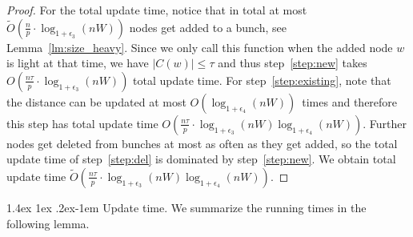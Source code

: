 \documentclass[11pt]{article}
\makeatletter
\theoremstyle{definition}
\theoremstyle{remark}
\renewcommand{\paragraph}{%
  \@startsection{paragraph}{4}%
  {\z@}{1.4ex \@plus 1ex \@minus .2ex}{-1em}%
  {\normalfont\normalsize\bfseries}%
}
\makeatother
\begin{document}
\begin{titlepage}
\begin{proof}
    For the total update time, notice that in total at most $\tilde O(\tfrac{n}{p}\cdot \log_{1+\epsilon_3}(nW))$ nodes get added to a bunch, see Lemma~\ref{lm:size_heavy}. Since we only call this function when the added node $w$ is light at that time, we have $|C(w)|\leq \tau$ and thus step~\ref{step:new} takes $O(\tfrac{n\tau}{p}\cdot \log_{1+\epsilon_3}(nW))$ total update time. For step~\ref{step:existing}, note that the distance can be updated at most $O(\log_{1+\epsilon_4}(nW))$~times and therefore this step has total update time $O(\tfrac{n\tau}{p}\cdot \log_{1+\epsilon_3}(nW)\log_{1+\epsilon_4}(nW))$. Further nodes get deleted from bunches at most as often as they get added, so the total update time of step~\ref{step:del} is dominated by step~\ref{step:new}. We obtain total update time $\tilde O ( \tfrac{n\tau }{p} \cdot \log_{1+\epsilon_3}(nW)\log_{1+\epsilon_4}(nW)) $.
\end{proof}

\paragraph{Update time.}
We summarize the running times in the following lemma. 


\end{titlepage}
\end{document}

